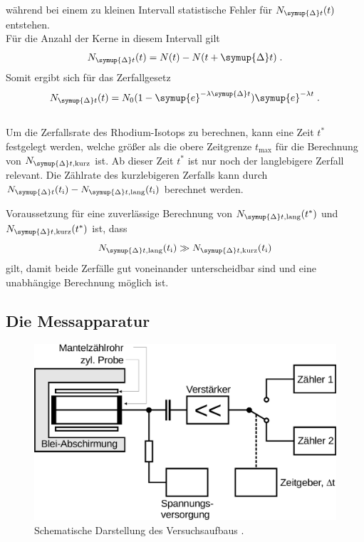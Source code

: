     während bei einem zu kleinen Intervall statistische Fehler für $N_{\symup{\Delta}t}(t)$ entstehen.\\
    Für die Anzahl der Kerne in diesem Intervall gilt
    \begin{equation*}
        N_{\symup{\Delta}t}(t) = N(t) - N(t + \symup{\Delta} t) \; .
    \end{equation*}
    Somit ergibt sich für das Zerfallgesetz
    \begin{equation*}
        N_{\symup{\Delta}t}(t) = N_0 (1 - \symup{e}^{-\lambda \symup{\Delta}t}) \symup{e}^{-\lambda t} \; .
    \end{equation*}
    \\
    Um die Zerfallsrate des Rhodium-Isotops zu berechnen,
    kann eine Zeit $t^*$ festgelegt werden,
    welche größer als die obere Zeitgrenze $t_\text{max}$ für die Berechnung von $N_{\symup{\Delta}t, \text{kurz}}$ ist.
    Ab dieser Zeit $t^*$ ist nur noch der langlebigere Zerfall relevant.
    Die Zählrate des kurzlebigeren Zerfalls kann durch $N_{\symup{\Delta}t} (t_\text{i}) - N_{\symup{\Delta}t, \text{lang}} (t_\text{i})$ berechnet werden.

    Voraussetzung für eine zuverlässige Berechnung von
    $N_{\symup{\Delta}t, \text{lang}} (t^*)$
    und $N_{\symup{\Delta}t, \text{kurz}} (t^*)$
    ist, dass
    \begin{equation*}
        N_{\symup{\Delta}t, \text{lang}} (t_\text{i}) \gg N_{\symup{\Delta}t, \text{kurz}} (t_\text{i})
    \end{equation*}
    gilt,
    damit beide Zerfälle gut voneinander unterscheidbar sind
    und eine unabhängige Berechnung möglich ist.

\subsection{Die Messapparatur}

    \begin{figure}[H]
      \centering
      \includegraphics[width=\textwidth]{content/img/V702_Abb3.jpg}
      \caption{Schematische Darstellung des Versuchsaufbaus \cite{versuchsanleitung}.}
      \label{fig:gmz}
    \end{figure}

